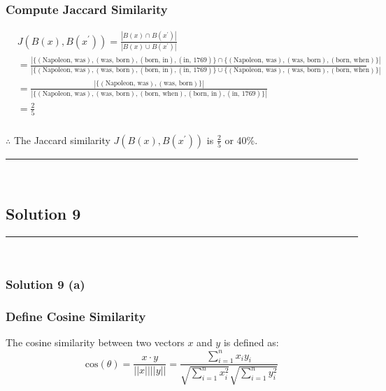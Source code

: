 \documentclass{article}
\begin{document}
\subsubsection*{Compute Jaccard Similarity}
\begin{align*}
    &J(B(x), B(x^{\prime})) = \frac{|B(x) \cap B(x^{\prime})|}{|B(x) \cup B(x^{\prime})|} \\
    &= \frac{|\{(\text{Napoleon, was}), (\text{was, born}), (\text{born, in}), (\text{in, 1769})\} \cap \{(\text{Napoleon, was}), (\text{was, born}), (\text{born, when})\}|}{|\{(\text{Napoleon, was}), (\text{was, born}), (\text{born, in}), (\text{in, 1769})\}\cup \{(\text{Napoleon, was}), (\text{was, born}), (\text{born, when})\}|} \\
    &= \frac{|\{(\text{Napoleon, was}), (\text{was, born})\}|}{|\{(\text{Napoleon, was}), (\text{was, born}), (\text{born, when}),(\text{born, in}), (\text{in, 1769})\}|} \\
    &= \frac{2}{5} 
\end{align*}


\subsubsection*{\normalfont}{$\therefore$ The Jaccard similarity $J(B(x), B(x^{\prime}))$ is $\frac{2}{5}$ or 40\%.}

\noindent\rule{\textwidth}{0.4pt}\\

\newpage

\subsection*{Solution 9}
\noindent\rule{\textwidth}{0.4pt}\\
\subsubsection*{Solution 9 (a)}
\subsubsection*{Define Cosine Similarity}
\parbox{\textwidth}{
  The cosine similarity between two vectors $x$ and $y$ is defined as:
  $$\text{cos}(\theta) = \frac{x \cdot y}{||x|| ||y||} = \frac{\sum_{i=1}^{n}x_{i}y_{i}}{\sqrt{\sum_{i=1}^{n}x_{i}^2}\sqrt{\sum_{i=1}^{n}y_{i}^2}}$$
}
\end{document}

